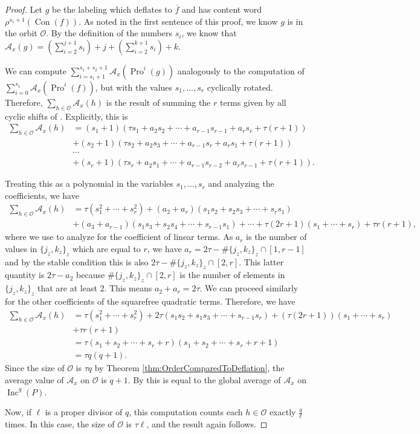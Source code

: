 \documentclass[10pt,a4paper]{amsart}
\DeclareMathOperator{\Con}{\mathrm{Con}}
\DeclareMathOperator{\Inc}{\mathrm{Inc}}
\DeclareMathOperator{\Pro}{\mathrm{Pro}}
\begin{document}
\begin{proof}
Let $g$ be the labeling which deflates to $\overline{f}$ and has content word $\rho^{s_1+1}(\Con(f))$. As noted in the first sentence of this proof, we know $g$ is in the orbit $\mathcal{O}$.  By the definition of the numbers $s_i$,  we know that $\mathcal{A}_x(g) = (\sum_{i=2}^{j+1} s_i) + j + (\sum_{i=2}^{k+1} s_i) + k$.

We can compute $\sum_{i=s_1 + 1}^{s_1 + s_2 + 1} \mathcal{A}_x(\Pro^i(g))$ analogously to the computation of $\sum_{i=0}^{s_1} \mathcal{A}_x(\Pro^i(f))$, but with the values $s_1,\ldots,s_r$ cyclically rotated. Therefore, $\sum_{h \in \mathcal{O}} \mathcal{A}_x(h)$ is the result of summing the $r$ terms given by all cyclic shifts of . Explicitly, this is \begin{align*}
\sum_{h \in \mathcal{O}}\mathcal{A}_x(h) &= (s_1 + 1)(\tau s_1 + a_2 s_2 + \cdots + a_{r-1}s_{r-1} + a_rs_r + \tau (r+1))\\
& + (s_2 + 1)(\tau s_2 + a_2s_3 + \cdots + a_{r-1}s_r + a_r s_1 + \tau (r+1))\\
& \cdots \\
& +(s_r + 1)(\tau s_r + a_2 s_1 + \cdots + a_{r-1}s_{r-2} + a_rs_{r-1} + \tau (r+1)).
\end{align*}

Treating this as a polynomial in the variables $s_1,\ldots,s_r$ and analyzing the coefficients, we have \begin{align*}
\sum_{h \in \mathcal{O}} \mathcal{A}_x(h) &= \tau(s_1^2 + \cdots + s_r^2) + (a_2+a_r)(s_1s_2 + s_2s_3 + \cdots + s_rs_1) \\
&+ (a_3 + a_{r-1})(s_1s_3 + s_2s_4 + \cdots + s_{r-1}s_1) + \cdots
+ \tau(2r+1) (s_1 + \cdots + s_r) + \tau r (r+1),
\end{align*}
where we use  to analyze for the coefficient of linear terms. As $a_r$ is the number of values in $\{j_z,k_z\}_z$ which are equal to $r$, we have $a_r=2\tau - \# \{j_z,k_z\}_z \cap [1,r-1]$ and by the stable condition this is also $2\tau - \# \{j_z,k_z\}_z \cap [2,r]$. This latter quantity is $2\tau - a_2$ because $\# \{j_z,k_z\}_z \cap [2,r]$ is the number of elements in $\{j_z,k_z\}_z$ that are at least 2. This means $a_2 + a_r = 2\tau$. We can proceed similarly for the other coefficients of the squarefree quadratic terms. Therefore, we have \begin{align*}
\sum_{h\in\mathcal{O}}\mathcal{A}_x(h) &= \tau(s_1^2 + \cdots + s_r^2) + 2\tau(s_1s_2 + s_1s_3 + \cdots + s_{r-1}s_r) + (\tau(2r+1) )(s_1 + \cdots + s_r) \\&+ \tau r (r+1)\\
&= \tau (s_1 + s_2 + \cdots + s_r + r)(s_1 + s_2 + \cdots + s_r + r+1)\\
&= \tau q (q+1).
\end{align*}
Since the size of $\mathcal{O}$ is $\tau q$ by Theorem \ref{thm:OrderComparedToDeflation}, the average value of $\mathcal{A}_x$ on $\mathcal{O}$ is $q+1$. By  this is equal to the global average of $\mathcal{A}_x$ on $\Inc^q(P)$. 

Now, if $\ell$ is a proper divisor of $q$, this computation counts each $h\in\mathcal{O}$ exactly $\frac{q}{\ell}$ times. In this case, the size of $\mathcal{O}$ is $\tau \ell$, and the result again follows.
\end{proof}
\end{document}
